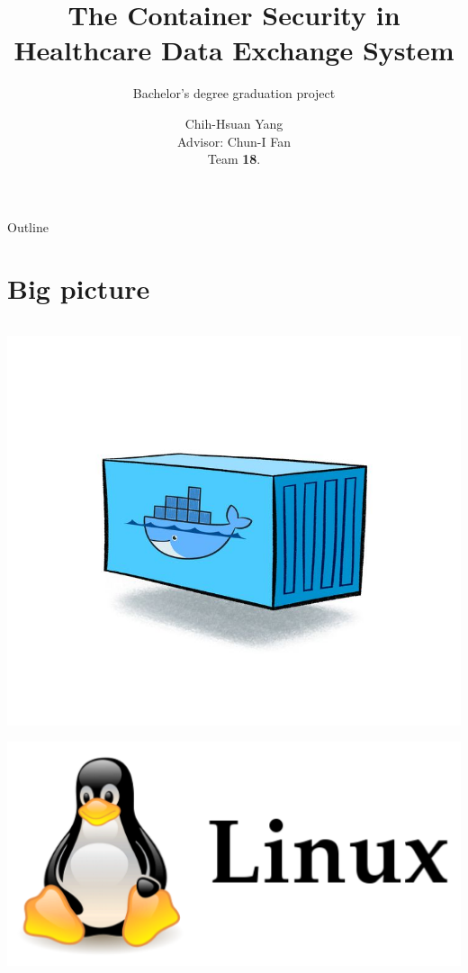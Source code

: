 \documentclass{beamer}
\title[Container Security]{The Container Security in Healthcare Data Exchange System}
\subtitle{Bachelor's degree graduation project}
\author[Chih-Hsuan Yang]{Chih-Hsuan Yang \\
{\small Advisor: Chun-I Fan} \\ 
{Team {\color{red} \textbf{18}}.}
}
\institute{NSYSU}
\date{}
\begin{document}
\begin{CJK*}{UTF8}{bsmi}

    \begin{frame}
        \titlepage
    \end{frame}

    \begin{frame}{Outline}
        \begin{multicols}{2}
            \tableofcontents
        \end{multicols}
    \end{frame}

    \section{Big picture}
    \begin{frame}
        \begin{columns}
            \begin{column}{0.30\textwidth}
                \centering
                \includegraphics[height=0.4\textheight, trim=150 100 100 100,clip]{container.jpg}
                \includegraphics[width=\textwidth]{linux.png}

\end{column}
\end{columns}
\end{frame}
\end{CJK*}
\end{document}
